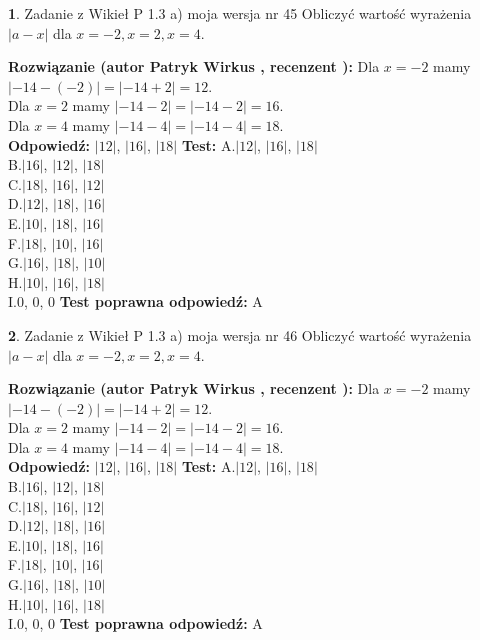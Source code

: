 \documentclass[12pt, a4paper]{article}
\theoremstyle{definition} %
\newtheorem{zad}{}
\newcommand{\zadStart}[1]{\begin{zad}#1\newline}
\newcommand{\zadStop}{\end{zad}}
\newcommand{\rozwStart}[2]{\noindent \textbf{Rozwiązanie (autor #1 , recenzent #2): }\newline}
\newcommand{\rozwStop}{\newline}
\newcommand{\odpStart}{\noindent \textbf{Odpowiedź:}\newline}
\newcommand{\odpStop}{\newline}
\newcommand{\testStart}{\noindent \textbf{Test:}\newline}
\newcommand{\testStop}{\newline}
\newcommand{\kluczStart}{\noindent \textbf{Test poprawna odpowiedź:}\newline}
\newcommand{\kluczStop}{\newline}
\begin{document}
\zadStart{Zadanie z Wikieł P 1.3 a) moja wersja nr 45}
Obliczyć wartość wyrażenia $|a - x|$ dla $x=-2,x=2,x=4$.
\zadStop
\rozwStart{Patryk Wirkus}{}
Dla $x = -2$ mamy $|-14 - (-2)| = |-14 + 2| = 12$.\\
Dla $x = 2$ mamy $|-14 - 2| = |-14 - 2| = 16$.\\
Dla $x = 4$ mamy $|-14 - 4| = |-14 - 4| = 18$.\\
\rozwStop
\odpStart
$|12|$, $|16|$, $|18|$
\odpStop
\testStart
A.$|12|$, $|16|$, $|18|$\\
B.$|16|$, $|12|$, $|18|$\\
C.$|18|$, $|16|$, $|12|$\\
D.$|12|$, $|18|$, $|16|$\\
E.$|10|$, $|18|$, $|16|$\\
F.$|18|$, $|10|$, $|16|$\\
G.$|16|$, $|18|$, $|10|$\\
H.$|10|$, $|16|$, $|18|$\\
I.$0$, $0$, $0$
\testStop
\kluczStart
A
\kluczStop



\zadStart{Zadanie z Wikieł P 1.3 a) moja wersja nr 46}
Obliczyć wartość wyrażenia $|a - x|$ dla $x=-2,x=2,x=4$.
\zadStop
\rozwStart{Patryk Wirkus}{}
Dla $x = -2$ mamy $|-14 - (-2)| = |-14 + 2| = 12$.\\
Dla $x = 2$ mamy $|-14 - 2| = |-14 - 2| = 16$.\\
Dla $x = 4$ mamy $|-14 - 4| = |-14 - 4| = 18$.\\
\rozwStop
\odpStart
$|12|$, $|16|$, $|18|$
\odpStop
\testStart
A.$|12|$, $|16|$, $|18|$\\
B.$|16|$, $|12|$, $|18|$\\
C.$|18|$, $|16|$, $|12|$\\
D.$|12|$, $|18|$, $|16|$\\
E.$|10|$, $|18|$, $|16|$\\
F.$|18|$, $|10|$, $|16|$\\
G.$|16|$, $|18|$, $|10|$\\
H.$|10|$, $|16|$, $|18|$\\
I.$0$, $0$, $0$
\testStop
\kluczStart
A
\kluczStop
\end{document}
